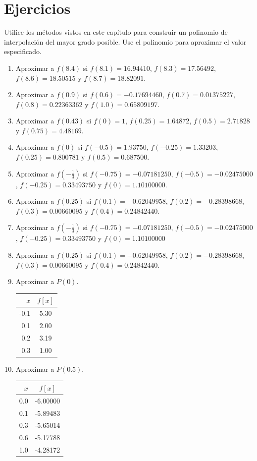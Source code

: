 \section{Ejercicios}
Utilice los métodos vistos en este capítulo para construir un polinomio de interpolación del mayor grado posible. Use el 
polinomio para aproximar el valor especificado.\\

\begin{enumerate}
	\item Aproximar a $f(8.4)$ si $f(8.1)=16.94410$, $f(8.3)=17.56492$, $f(8.6)=18.50515$ y $f(8.7)=18.82091$.
	\item Aproximar a $f(0.9)$ si $f(0.6)=-0.17694460$, $f(0.7)=0.01375227$, $f(0.8)=0.22363362$ y $f(1.0)=0.65809197$.
	\item Aproximar a $f(0.43)$ si $f(0)=1$, $f(0.25)=1.64872$, $f(0.5)=2.71828$ y $f(0.75)=4.48169$.
	\item Aproximar a $f(0)$ si $f(-0.5)=1.93750$, $f(-0.25)=1.33203$, $f(0.25)=0.800781$ y $f(0.5)=0.687500$.
	\item Aproximar a $f(-\frac{1}{3})$ si $f(-0.75)=-0.07181250$, $f(-0.5)=-0.02475000$, $f(-0.25)=0.33493750$ y $f(0)=1.10100000$.
	\item Aproximar a $f(0.25)$ si $f(0.1)=-0.62049958$, $f(0.2)=-0.28398668$, $f(0.3)=0.00660095$ y $f(0.4)=0.24842440$.
	\item Aproximar a $f(-\frac{1}{3})$ si $f(-0.75)=-0.07181250$, $f(-0.5)=-0.02475000$, $f(-0.25)=0.33493750$ y $f(0)=1.10100000$
	\item Aproximar a $f(0.25)$ si $f(0.1)=-0.62049958$, $f(0.2)=-0.28398668$, $f(0.3)=0.00660095$ y $f(0.4)=0.24842440$.
	\item Aproximar a $P(0)$.
		\begin{table}[H]
		\centering
      		\begin{tabular}{r|c}
					$x$ & $f[x]$ \\ \hline
					-0.1 & 5.30\\
					0.1 & 2.00\\
					0.2 & 3.19\\
					0.3 & 1.00\\
      		\end{tabular}
		\end{table}
	\item Aproximar a $P(0.5)$.
		\begin{table}[H]
		\centering
      		\begin{tabular}{r|c}
					$x$ & $f[x]$ \\ \hline
					0.0 & -6.00000\\
					0.1 & -5.89483\\
					0.3 & -5.65014\\
					0.6 & -5.17788\\
					1.0 & -4.28172\\
      		\end{tabular}
		\end{table}
\end{enumerate}